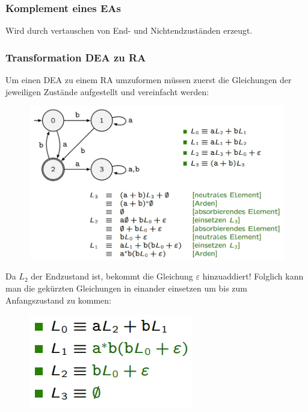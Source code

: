 \documentclass[12pt,a4paper]{article}
\begin{document}
	\subsubsection{Komplement eines EAs}
	Wird durch vertauschen von End- und Nichtendzuständen erzeugt.

	\subsubsection{Transformation DEA zu RA}
	Um einen DEA zu einem RA umzuformen müssen zuerst die Gleichungen der jeweiligen Zustände aufgestellt und vereinfacht werden:\newline
	\begin{center}
		\begin{figure}[!h]
			\includegraphics[width=\textwidth]{Bilder/DEAzuRA1.png}
		\end{figure}
	\end{center}
	Da $L_2$ der Endzustand ist, bekommt die Gleichung $\varepsilon$ hinzuaddiert!\newline
	Folglich kann man die gekürzten Gleichungen in einander einsetzen um bis zum Anfangszustand zu kommen:\newline
	\begin{center}
		\begin{figure}[!h]
			\includegraphics[]{Bilder/DEAzuRA2.png}
		\end{figure}
	\end{center}
\end{document}
